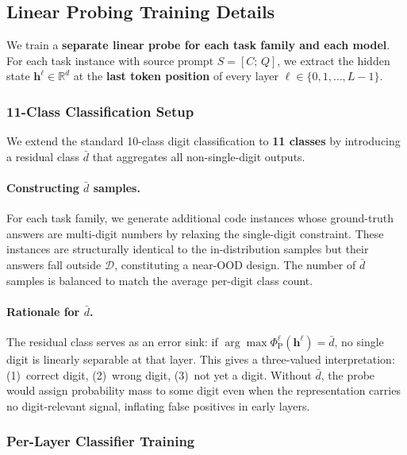 \subsection{Linear Probing Training Details}
\label{app:probing_training_details}

We train a \textbf{separate linear probe for each task family and each model}. For each task instance with source prompt $S = [C;\, Q]$, we extract the hidden state $\mathbf{h}^\ell \in \mathbb{R}^d$ at the \textbf{last token position} of every layer $\ell \in \{0, 1, \dots, L{-}1\}$.

\subsubsection{11-Class Classification Setup}
\label{app:subsec:probing_classes}

We extend the standard 10-class digit classification to \textbf{11 classes} by introducing a residual class $\bar{d}$ that aggregates all non-single-digit outputs.

\paragraph{Constructing $\bar{d}$ samples.} For each task family, we generate additional code instances whose ground-truth answers are multi-digit numbers by relaxing the single-digit constraint. These instances are structurally identical to the in-distribution samples but their answers fall outside $\mathcal{D}$, constituting a near-OOD design. The number of $\bar{d}$ samples is balanced to match the average per-digit class count.

\paragraph{Rationale for $\bar{d}$.} The residual class serves as an error sink: if $\arg\max \Phi_{\mathrm{P}}^\ell(\mathbf{h}^\ell) = \bar{d}$, no single digit is linearly separable at that layer. This gives a three-valued interpretation: (1)~correct digit, (2)~wrong digit, (3)~not yet a digit. Without $\bar{d}$, the probe would assign probability mass to some digit even when the representation carries no digit-relevant signal, inflating false positives in early layers.

\subsubsection{Per-Layer Classifier Training}
\label{app:subsec:probing_training}

